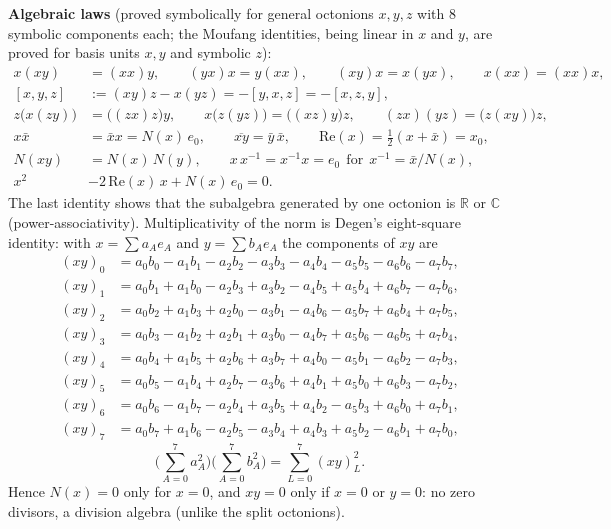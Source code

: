\documentclass[10pt,a4paper]{article}
\begin{document}
\textbf{Algebraic laws} (proved symbolically for general octonions $x,y,z$ with 8 symbolic components each; the Moufang identities, being linear in $x$ and $y$, are proved for basis units $x,y$ and symbolic $z$):
\begin{align*}
x(xy)&=(xx)y,\qquad (yx)x=y(xx),\qquad (xy)x=x(yx),\qquad x(xx)=(xx)x, \\
{}[x,y,z]&:=(xy)z-x(yz)=-[y,x,z]=-[x,z,y], \\
z\big(x(zy)\big)&=\big((zx)z\big)y,\qquad x\big(z(yz)\big)=\big((xz)y\big)z,\qquad (zx)(yz)=\big(z(xy)\big)z, \\
x\bar x&=\bar x x=N(x)\,e_0,\qquad \overline{xy}=\bar y\,\bar x,\qquad \mathrm{Re}(x)=\tfrac12(x+\bar x)=x_0, \\
N(xy)&=N(x)\,N(y),\qquad x\,x^{-1}=x^{-1}x=e_0\ \ \text{for}\ \ x^{-1}=\bar x/N(x), \\
x^2&-2\,\mathrm{Re}(x)\,x+N(x)\,e_0=0 .
\end{align*}
The last identity shows that the subalgebra generated by one octonion is $\mathbb R$ or $\mathbb C$ (power-associativity). Multiplicativity of the norm is Degen's eight-square identity: with $x=\sum a_Ae_A$ and $y=\sum b_Ae_A$ the components of $xy$ are
\begin{align*}
(xy)_{0}&=a_{0} b_{0} - a_{1} b_{1} - a_{2} b_{2} - a_{3} b_{3} - a_{4} b_{4} - a_{5} b_{5} - a_{6} b_{6} - a_{7} b_{7}, \\
(xy)_{1}&=a_{0} b_{1} + a_{1} b_{0} - a_{2} b_{3} + a_{3} b_{2} - a_{4} b_{5} + a_{5} b_{4} + a_{6} b_{7} - a_{7} b_{6}, \\
(xy)_{2}&=a_{0} b_{2} + a_{1} b_{3} + a_{2} b_{0} - a_{3} b_{1} - a_{4} b_{6} - a_{5} b_{7} + a_{6} b_{4} + a_{7} b_{5}, \\
(xy)_{3}&=a_{0} b_{3} - a_{1} b_{2} + a_{2} b_{1} + a_{3} b_{0} - a_{4} b_{7} + a_{5} b_{6} - a_{6} b_{5} + a_{7} b_{4}, \\
(xy)_{4}&=a_{0} b_{4} + a_{1} b_{5} + a_{2} b_{6} + a_{3} b_{7} + a_{4} b_{0} - a_{5} b_{1} - a_{6} b_{2} - a_{7} b_{3}, \\
(xy)_{5}&=a_{0} b_{5} - a_{1} b_{4} + a_{2} b_{7} - a_{3} b_{6} + a_{4} b_{1} + a_{5} b_{0} + a_{6} b_{3} - a_{7} b_{2}, \\
(xy)_{6}&=a_{0} b_{6} - a_{1} b_{7} - a_{2} b_{4} + a_{3} b_{5} + a_{4} b_{2} - a_{5} b_{3} + a_{6} b_{0} + a_{7} b_{1}, \\
(xy)_{7}&=a_{0} b_{7} + a_{1} b_{6} - a_{2} b_{5} - a_{3} b_{4} + a_{4} b_{3} + a_{5} b_{2} - a_{6} b_{1} + a_{7} b_{0},
\end{align*}
\begin{equation*}
\Big(\sum_{A=0}^{7}a_A^2\Big)\Big(\sum_{A=0}^{7}b_A^2\Big)=\sum_{L=0}^{7}(xy)_L^2 .
\end{equation*}
Hence $N(x)=0$ only for $x=0$, and $xy=0$ only if $x=0$ or $y=0$: no zero divisors, a division algebra (unlike the split octonions).
\end{document}
